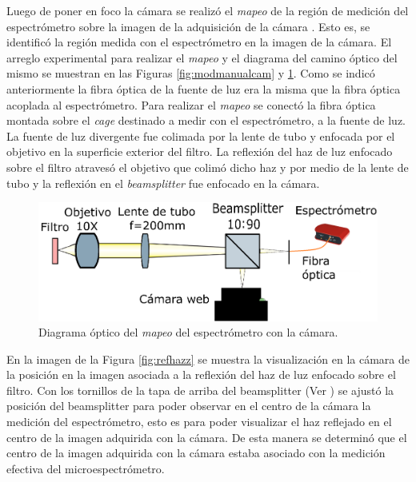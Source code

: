 Luego de poner en foco la cámara se realizó el \textit{mapeo} de la región de medición del espectrómetro sobre la imagen de la adquisición de la cámara \cite{frise}. Esto es, se identificó la región medida con el espectrómetro en la imagen de la cámara. El arreglo experimental para realizar el \textit{mapeo} y el diagrama del camino óptico del mismo se muestran en las Figuras \ref{fig:modmanualcam} y \ref{fig:caminmapp}. Como se indicó anteriormente la fibra óptica de la fuente de luz era la misma que la fibra óptica acoplada al espectrómetro. Para realizar el \textit{mapeo} se conectó la fibra óptica montada sobre el \textit{cage} destinado a medir con el espectrómetro, a la fuente de luz. La fuente de luz divergente fue colimada por la lente de tubo y enfocada por el objetivo en la superficie exterior del filtro. La reflexión del haz de luz enfocado sobre el filtro atravesó el objetivo que colimó dicho haz y por medio de la lente de tubo y la reflexión en el \textit{beamsplitter} fue enfocado en la cámara.

\begin{figure}[H]
	\centering
	\includegraphics[width=1.0\textwidth]{Figs/microespectrometro/diagopticomapcamspec.png}
	\caption{Diagrama óptico del \textit{mapeo} del espectrómetro con la cámara.}
	\label{fig:caminmapp}
\end{figure}

 En la imagen de la Figura \ref{fig:refhazz} se muestra la visualización en la cámara de la posición en la imagen asociada a la reflexión del haz de luz enfocado sobre el filtro. Con los tornillos de la tapa de arriba del beamsplitter (Ver \href{https://www.thorlabs.com/images/TabImages/Kinematic\_Cube\_Platform\_A1-780.jpg}{\faImage}) se ajustó la posición del beamsplitter para poder observar en el centro de la cámara la medición del espectrómetro, esto es para poder visualizar el haz reflejado en el centro de la imagen adquirida con la cámara. De esta manera se determinó que el centro de la imagen adquirida con la cámara estaba asociado con la medición efectiva del microespectrómetro.

